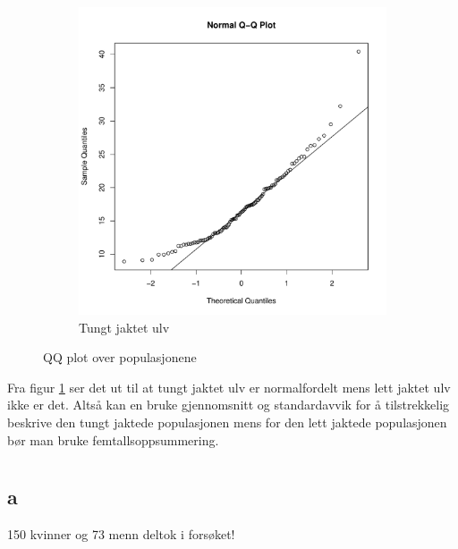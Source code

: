 \begin{figure}[H]
\begin{subfigure}{0.5\textwidth}
        \includegraphics[width=\linewidth]{TUNGT.pdf}
        \caption{Tungt jaktet ulv}
    \end{subfigure}
    \caption{QQ plot over populasjonene}
    \label{fig:2G}
\end{figure}

Fra figur \ref{fig:2G} ser det ut til at tungt jaktet ulv er normalfordelt mens lett jaktet ulv ikke er det. Altså kan en bruke gjennomsnitt og standardavvik for å tilstrekkelig beskrive den tungt jaktede populasjonen mens for den lett jaktede populasjonen bør man bruke femtallsoppsummering.

\pagebreak
\section{}

\subsection*{a}

150 kvinner og 73 menn deltok i forsøket! 

